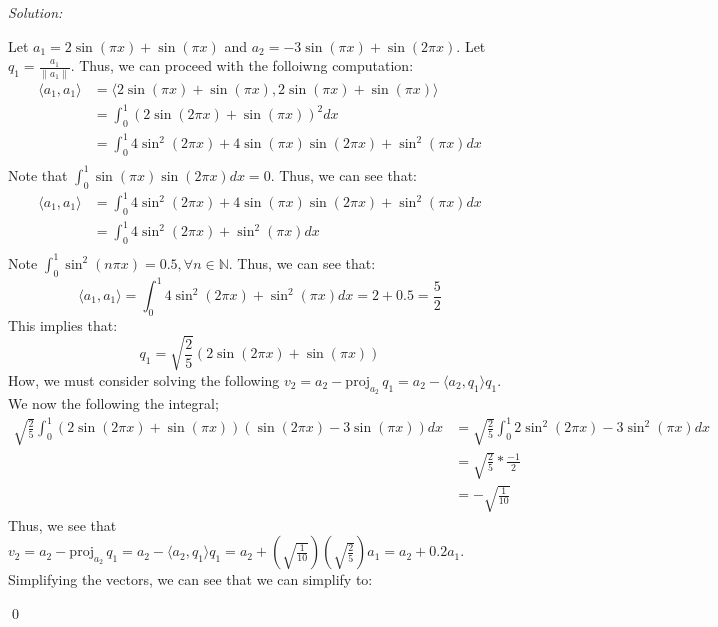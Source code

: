 \documentclass[12pt]{article}
\newenvironment{problem}[2][Problem]{\begin{trivlist}
\item[\hskip \labelsep {\bfseries #1}\hskip \labelsep {\bfseries #2.}]}{\end{trivlist}}
\newenvironment{sol}
    {\emph{Solution:}
    }
    {
    \qed
    }
\newcommand{\N}{\mathbb{N}}
\newcommand{\proj}[2]{\mathrm{proj}_{{#2}}\,{#1}}
\begin{document}
\begin{problem}{5}
    
\end{problem}

\begin{problem}{6}
    
\end{problem}
\begin{sol}
    Let $a_1 = 2\sin (\pi x) + \sin(\pi x)$ and $a_2 = -3 \sin(\pi x) + \sin(2 \pi x)$. Let $q_1 = \frac{a_1}{\|a_1\|}$. Thus, we can proceed with the folloiwng computation:
    \begin{align*}
        \langle a_1, a_1 \rangle &= \langle  2\sin (\pi x) + \sin(\pi x),  2\sin (\pi x) + \sin(\pi x)\rangle \\
        &= \int_{0}^{1} (2\sin(2\pi x) + \sin(\pi x))^2 dx\\
        &= \int_{0}^{1} 4\sin^2(2\pi x) + 4\sin(\pi x) \sin(2\pi x) + \sin^2(\pi x)dx\\
    \end{align*}
    Note that $\int_{0}^{1} \sin(\pi x) \sin( 2\pi x) dx = 0$. Thus, we can see that:
    \begin{align*}
        \langle a_1, a_1 \rangle &= \int_{0}^{1} 4\sin^2(2\pi x) + 4\sin(\pi x) \sin(2\pi x) + \sin^2(\pi x)dx \\
        &= \int_{0}^{1} 4\sin^2(2\pi x) + \sin^2(\pi x)dx \\
    \end{align*}
    Note $\int_{0}^{1} \sin^2( n \pi x) = 0.5, \forall n \in \N$. Thus, we can see that:
    \[
        \langle a_1, a_1 \rangle = \int_{0}^{1} 4\sin^2(2\pi x) + \sin^2(\pi x)dx = 2 + 0.5 = \frac{5}{2}
    \]
    This implies that:
    \[
    q_1 = \sqrt{\frac{2}{5}} (2\sin(2\pi x) + \sin(\pi x))
    \]
    How, we must consider solving the following $v_2 = a_2 - \proj{q_1}{a_2} = a_2 - \langle a_2, q_1 \rangle q_1$. We now the following the integral;
    \begin{align*}
        \sqrt{\frac{2}{5}} \int_{0}^{1} (2\sin(2\pi x) + \sin(\pi x))(\sin(2\pi x) - 3\sin(\pi x))dx &= \sqrt{\frac{2}{5}} \int_{0}^{1} 2\sin^2(2\pi x) - 3\sin^2(\pi x)dx\\
        &= \sqrt{\frac{2}{5}} * \frac{-1}{2}\\
        &= - \sqrt{\frac{1}{10}}
    \end{align*}
    Thus, we see that $v_2 = a_2 - \proj{q_1}{a_2} = a_2 - \langle a_2, q_1 \rangle q_1 = a_2 + \left( \sqrt{\frac{1}{10}} \right) \left( \sqrt{\frac{2}{5}} \right)a_1 = a_2 + 0.2a_1$. Simplifying the vectors, we can see that we can simplify to:

\end{sol}
\end{document}
